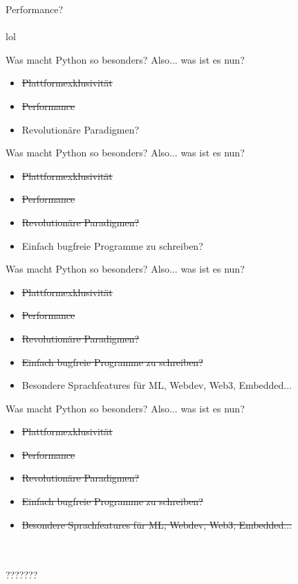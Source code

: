 \documentclass{beamer}
\begin{document}
\begin{frame}
\begin{center}
{ \Huge Performance?}\\~\\
lol
\end{center}
\end{frame}

\begin{frame}[t]{Was macht Python so besonders?}
Also... was ist es nun?
\pause
\begin{itemize}
\item \sout{Plattformexklusivität}
\pause
\item \sout{Performance}
\pause
\item Revolutionäre Paradigmen?
\end{itemize}
\end{frame}

\begin{frame}[t]{Was macht Python so besonders?}
Also... was ist es nun?
\begin{itemize}
\item \sout{Plattformexklusivität}
\item \sout{Performance}
\item \sout{Revolutionäre Paradigmen?}
\item Einfach bugfreie Programme zu schreiben? %
\end{itemize}
\end{frame}

\begin{frame}[t]{Was macht Python so besonders?}
Also... was ist es nun?
\begin{itemize}
\item \sout{Plattformexklusivität}
\item \sout{Performance}
\item \sout{Revolutionäre Paradigmen?}
\item \sout{Einfach bugfreie Programme zu schreiben?}
\item Besondere Sprachfeatures für ML, Webdev, Web3, Embedded...
\end{itemize}
\end{frame}

\begin{frame}[t]{Was macht Python so besonders?}
Also... was ist es nun?
\begin{itemize}
\item \sout{Plattformexklusivität}
\item \sout{Performance}
\item \sout{Revolutionäre Paradigmen?}
\item \sout{Einfach bugfreie Programme zu schreiben?}
\item \sout{Besondere Sprachfeatures für ML, Webdev, Web3, Embedded...}
\end{itemize}
\begin{center}
{~\\~\\\Huge ???????}
\end{center}
\end{frame}
\end{document}
